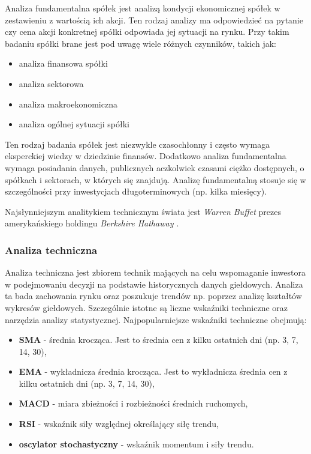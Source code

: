 \documentclass[a4paper, twoside, 11pt, openright]{article}
\begin{document}
Analiza fundamentalna spółek jest analizą kondycji ekonomicznej spółek w zestawieniu z wartością ich akcji. Ten rodzaj analizy ma odpowiedzieć na pytanie czy cena akcji konkretnej spółki odpowiada jej sytuacji na rynku. Przy takim badaniu spółki brane jest pod uwagę wiele różnych czynników, takich jak:
\begin{itemize}
\item{analiza finansowa spółki}
\item{analiza sektorowa}
\item{analiza makroekonomiczna}
\item{analiza ogólnej sytuacji spółki}
\end{itemize}

Ten rodzaj badania spółek jest niezwykle czasochłonny i często wymaga eksperckiej wiedzy w dziedzinie finansów. Dodatkowo analiza fundamentalna wymaga posiadania danych, publicznych aczkolwiek czasami ciężko dostępnych, o spółkach i sektorach, w których się znajdują. Analizę fundamentalną stosuje się w szczególności przy inwestycjach długoterminowych (np. kilka miesięcy).

Najsłynniejszym analitykiem technicznym świata jest \textit{Warren Buffet} prezes amerykańskiego holdingu \textit{Berkshire Hathaway \cite{berkeshire}}. 

\subsubsection{Analiza techniczna \cite{technicalanalysis}}

Analiza techniczna jest zbiorem technik mających na celu wspomaganie inwestora w podejmowaniu decyzji na podstawie historycznych danych giełdowych. Analiza ta bada zachowania rynku oraz poszukuje trendów np. poprzez analizę kształtów wykresów giełdowych. Szczególnie istotne są liczne wskaźniki techniczne oraz narzędzia analizy statystycznej.
Najpopularniejsze wskaźniki techniczne obejmują:
\begin{itemize}
\item{\textbf{SMA}} - średnia krocząca. Jest to średnia cen z kilku ostatnich dni (np. 3, 7, 14, 30),
\item{\textbf{EMA}} - wykładnicza średnia krocząca. Jest to wykładnicza średnia cen z kilku ostatnich dni (np. 3, 7, 14, 30),
\item{\textbf{MACD}} -  miara zbieżności i rozbieżności średnich ruchomych,
\item{\textbf{RSI}} -  wskaźnik siły względnej określający siłę trendu,
\item{\textbf{oscylator stochastyczny}} -  wskaźnik momentum i siły trendu.
\end{itemize}
\end{document}
